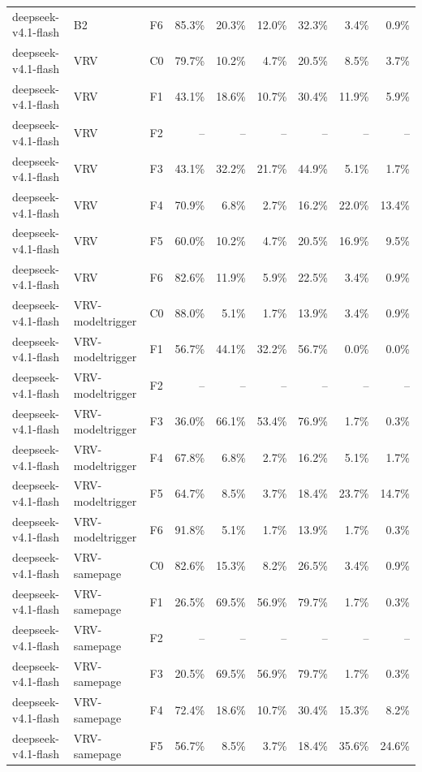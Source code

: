 \begin{tabular}{lllrrrrrr}
deepseek-v4.1-flash & B2 & F6 & 85.3\% & 20.3\% & 12.0\% & 32.3\% & 3.4\% & 0.9\% \\
deepseek-v4.1-flash & VRV & C0 & 79.7\% & 10.2\% & 4.7\% & 20.5\% & 8.5\% & 3.7\% \\
deepseek-v4.1-flash & VRV & F1 & 43.1\% & 18.6\% & 10.7\% & 30.4\% & 11.9\% & 5.9\% \\
deepseek-v4.1-flash & VRV & F2 & -- & -- & -- & -- & -- & -- \\
deepseek-v4.1-flash & VRV & F3 & 43.1\% & 32.2\% & 21.7\% & 44.9\% & 5.1\% & 1.7\% \\
deepseek-v4.1-flash & VRV & F4 & 70.9\% & 6.8\% & 2.7\% & 16.2\% & 22.0\% & 13.4\% \\
deepseek-v4.1-flash & VRV & F5 & 60.0\% & 10.2\% & 4.7\% & 20.5\% & 16.9\% & 9.5\% \\
deepseek-v4.1-flash & VRV & F6 & 82.6\% & 11.9\% & 5.9\% & 22.5\% & 3.4\% & 0.9\% \\
deepseek-v4.1-flash & VRV-modeltrigger & C0 & 88.0\% & 5.1\% & 1.7\% & 13.9\% & 3.4\% & 0.9\% \\
deepseek-v4.1-flash & VRV-modeltrigger & F1 & 56.7\% & 44.1\% & 32.2\% & 56.7\% & 0.0\% & 0.0\% \\
deepseek-v4.1-flash & VRV-modeltrigger & F2 & -- & -- & -- & -- & -- & -- \\
deepseek-v4.1-flash & VRV-modeltrigger & F3 & 36.0\% & 66.1\% & 53.4\% & 76.9\% & 1.7\% & 0.3\% \\
deepseek-v4.1-flash & VRV-modeltrigger & F4 & 67.8\% & 6.8\% & 2.7\% & 16.2\% & 5.1\% & 1.7\% \\
deepseek-v4.1-flash & VRV-modeltrigger & F5 & 64.7\% & 8.5\% & 3.7\% & 18.4\% & 23.7\% & 14.7\% \\
deepseek-v4.1-flash & VRV-modeltrigger & F6 & 91.8\% & 5.1\% & 1.7\% & 13.9\% & 1.7\% & 0.3\% \\
deepseek-v4.1-flash & VRV-samepage & C0 & 82.6\% & 15.3\% & 8.2\% & 26.5\% & 3.4\% & 0.9\% \\
deepseek-v4.1-flash & VRV-samepage & F1 & 26.5\% & 69.5\% & 56.9\% & 79.7\% & 1.7\% & 0.3\% \\
deepseek-v4.1-flash & VRV-samepage & F2 & -- & -- & -- & -- & -- & -- \\
deepseek-v4.1-flash & VRV-samepage & F3 & 20.5\% & 69.5\% & 56.9\% & 79.7\% & 1.7\% & 0.3\% \\
deepseek-v4.1-flash & VRV-samepage & F4 & 72.4\% & 18.6\% & 10.7\% & 30.4\% & 15.3\% & 8.2\% \\
deepseek-v4.1-flash & VRV-samepage & F5 & 56.7\% & 8.5\% & 3.7\% & 18.4\% & 35.6\% & 24.6\% \\

\end{tabular}
